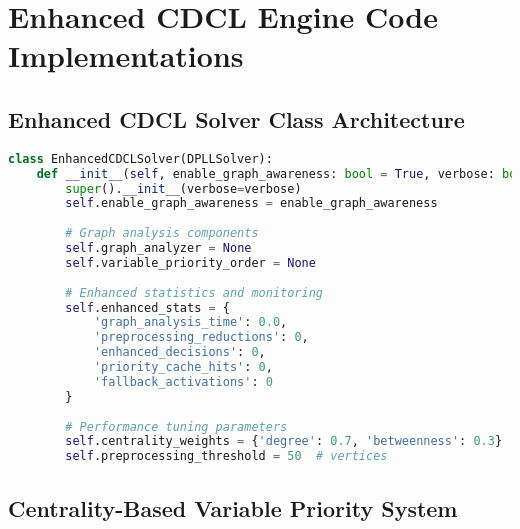 \appendix

\section{Enhanced CDCL Engine Code Implementations}

\subsection{Enhanced CDCL Solver Class Architecture}
\label{appendix:enhanced-cdcl-class}

\begin{lstlisting}[language=Python, caption=Enhanced CDCL Solver Class Architecture]
class EnhancedCDCLSolver(DPLLSolver):
    def __init__(self, enable_graph_awareness: bool = True, verbose: bool = False):
        super().__init__(verbose=verbose)
        self.enable_graph_awareness = enable_graph_awareness
        
        # Graph analysis components
        self.graph_analyzer = None
        self.variable_priority_order = None
        
        # Enhanced statistics and monitoring
        self.enhanced_stats = {
            'graph_analysis_time': 0.0,
            'preprocessing_reductions': 0,
            'enhanced_decisions': 0,
            'priority_cache_hits': 0,
            'fallback_activations': 0
        }
        
        # Performance tuning parameters
        self.centrality_weights = {'degree': 0.7, 'betweenness': 0.3}
        self.preprocessing_threshold = 50  # vertices
\end{lstlisting}

\subsection{Centrality-Based Variable Priority System}
\label{appendix:centrality-priority}

